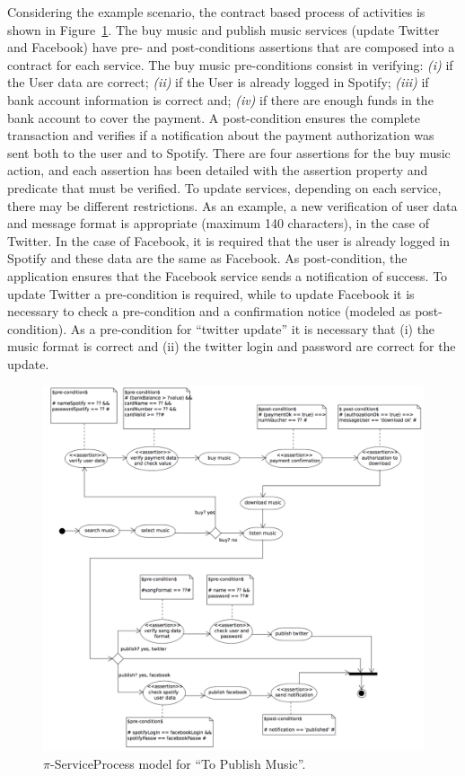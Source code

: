 \documentclass{singlecol-new}
\theoremstyle{TH}{
\newtheorem{lemma}{Lemma}
\newtheorem{theorem}[lemma]{Theorem}
\newtheorem{corrolary}[lemma]{Corrolary}
\newtheorem{conjecture}[lemma]{Conjecture}
\newtheorem{proposition}[lemma]{Proposition}
\newtheorem{claim}[lemma]{Claim}
\newtheorem{stheorem}[lemma]{Wrong Theorem}
\newtheorem{algorithm}{Algorithm}
}
\theoremstyle{THrm}{
\newtheorem{definition}{Definition}[section]
\newtheorem{question}{Question}[section]
\newtheorem{remark}{Remark}
\newtheorem{scheme}{Scheme}
}
\theoremstyle{THhit}{
\newtheorem{case}{Case}[section]
}
\theoremstyle{THhsl}{
\newtheorem{example}{Example}
}
\begin{document}
\begin{example}\label{ex:toPublicMusic3}
Considering the example scenario, the contract based process of activities  is shown in Figure~\ref{fig:CIM:serviceprocess}. The buy music and publish music services (update Twitter and Facebook) have pre- and post-conditions assertions that are composed into a contract for each service. The buy music pre-conditions consist in verifying:
\textit{(i)} if the User data are correct;
\textit{(ii)} if the User is already logged in Spotify;
\textit{(iii)} if bank account information is correct and;
\textit{(iv)} if there are enough funds in the bank account to cover the payment.
A post-condition ensures the complete transaction and verifies if a notification about the payment authorization was sent both to the user and to Spotify. 
There are four assertions for the buy music action, and each assertion has been detailed with the assertion property and predicate that must be verified. 
To update services, depending on each service, there may be different restrictions. As an example, a new verification of user data and message format is appropriate (maximum 140 characters), in the case of Twitter. In the case of Facebook, it is required that the user is already logged in Spotify and these data are the same as Facebook.
As post-condition, the application ensures that the Facebook service sends a notification of success.
To update Twitter a pre-condition is required, while to update Facebook it is necessary to check a pre-condition and a confirmation notice (modeled as post-condition).
As a pre-condition for ``twitter update'' it is necessary that (i) the music format is correct and (ii) the twitter login and password are correct for the update.
\end{example}

\begin{figure}[h]
\center
\includegraphics[width=1\textwidth]{./figures/ServiceProcess.pdf}
\caption{\label{fig:CIM:serviceprocess} $\pi$-ServiceProcess model for ``To Publish Music''.}
\end{figure}
\end{document}

